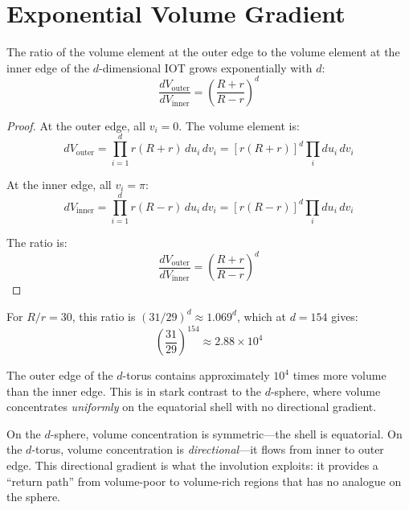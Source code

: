 \section{Exponential Volume Gradient}
\label{sec:volume_gradient}

\begin{theorem}
\label{thm:volume_gradient}
The ratio of the volume element at the outer edge to the volume element at the inner edge of the $d$-dimensional IOT grows exponentially with $d$:
\begin{equation}
    \frac{dV_{\text{outer}}}{dV_{\text{inner}}} = \left(\frac{R+r}{R-r}\right)^d
\end{equation}
\end{theorem}

\begin{proof}
At the outer edge, all $v_i = 0$. The volume element is:
\begin{equation}
    dV_{\text{outer}} = \prod_{i=1}^{d} r(R + r) \, du_i \, dv_i = [r(R+r)]^d \prod_{i} du_i \, dv_i
\end{equation}

At the inner edge, all $v_i = \pi$:
\begin{equation}
    dV_{\text{inner}} = \prod_{i=1}^{d} r(R - r) \, du_i \, dv_i = [r(R-r)]^d \prod_{i} du_i \, dv_i
\end{equation}

The ratio is:
\begin{equation}
    \frac{dV_{\text{outer}}}{dV_{\text{inner}}} = \left(\frac{R+r}{R-r}\right)^d
\end{equation}
\end{proof}

For $R/r = 30$, this ratio is $(31/29)^d \approx 1.069^d$, which at $d = 154$ gives:
\begin{equation}
    \left(\frac{31}{29}\right)^{154} \approx 2.88 \times 10^4
\end{equation}

The outer edge of the $d$-torus contains approximately $10^4$ times more volume than the inner edge. This is in stark contrast to the $d$-sphere, where volume concentrates \emph{uniformly} on the equatorial shell with no directional gradient.

\begin{remark}
On the $d$-sphere, volume concentration is symmetric---the shell is equatorial. On the $d$-torus, volume concentration is \emph{directional}---it flows from inner to outer edge. This directional gradient is what the involution exploits: it provides a ``return path'' from volume-poor to volume-rich regions that has no analogue on the sphere.
\end{remark}

